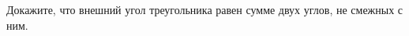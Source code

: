 \begin{ex}
	\begin{condition}
		Докажите, что внешний угол треугольника равен сумме двух углов, не смежных с ним.
	\end{condition}
\end{ex}